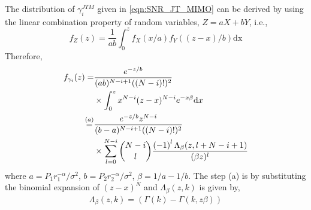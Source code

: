 The distribution of $\gamma_{i}^{JTM}$ given in \eqref{eqn:SNR_JT_MIMO} can be derived by using the linear combination property of random variables, $Z=a X+b Y$, i.e., 
\[f_Z(z) = \frac{1}{ab} \int_{0}^{z} f_X(x/a) f_Y((z-x)/b) \text{dx}\]
Therefore,
\begin{align}
    \label{eqn:deri_fZz_JTMIMO}
    f_{\gamma_i}(z) =& \frac{e^{-z/b}}{(ab)^{N-i+1}((N-i)!)^2}\nonumber\\
    &\times\int_{0}^{z} x^{N-i}(z-x)^{N-i} e^{-x\beta}\mathrm{d} x\nonumber\\
    \stackrel{(a)}{=}& \frac{e^{-z/b}z^{N-i}}{(b-a)^{N-i+1}((N-i)!)^2} \nonumber\\
    &\times\sum_{l=0}^{N-i} {N-i \choose l}  \frac{\left(-1\right)^l\Lambda_{\beta}(z,l+N-i+1)}{(\beta  z)^{l}}
\end{align}
where  $a=P_1r_1^{-\alpha}/\sigma^2$, $b=P_2r_2^{-\alpha}/\sigma^2$,  $\beta=1/a-1/b$. The step (a) is by substituting the binomial expansion of $(z-x)^{N}$ and $\Lambda_{\beta}(z,k)$ is given by,
\begin{align}\label{eqn:Lambda_def}
\Lambda_{\beta}(z,k) =(\Gamma (k)-\Gamma (k,z
\beta ))
\end{align}
